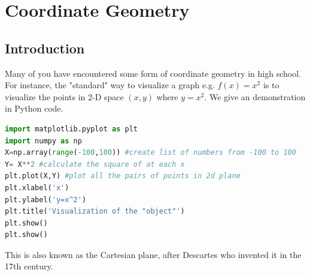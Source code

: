 \chapter{Coordinate Geometry}

\section{Introduction}
Many of you have encountered some form of coordinate geometry in high school. For instance, the "standard" way to visualize a graph e.g. $f(x)=x^2$ is to visualize the points in 2-D space $(x,y)$ where $y=x^2$. We give an demonstration in Python code.

\begin{lstlisting}[language=Python]
import matplotlib.pyplot as plt
import numpy as np
X=np.array(range(-100,100)) #create list of numbers from -100 to 100
Y= X**2 #calculate the square of at each x
plt.plot(X,Y) #plot all the pairs of points in 2d plane
plt.xlabel('x')
plt.ylabel('y=x^2')
plt.title('Visualization of the "object"')
plt.show()
plt.show()
\end{lstlisting}


This is also known as the Cartesian plane, after Descartes who invented it in the 17th century.\\
